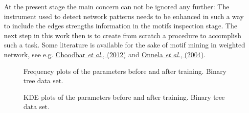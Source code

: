 \documentclass[a4paper,12pt]{article}
\begin{document}
At the present stage the main concern can not be ignored any further: The instrument used to detect network patterns needs to be enhanced in such a way to include the edges strengths information in the motifs inspection stage. The next step in this work then is to create from scratch a procedure to accomplish such a task. Some literature is available for the sake of motif mining in weighted network, see e.g. \href{https://ieeexplore.ieee.org/document/6406443}{Choodbar \textit{et al.}, (2012)} and \href{https://arxiv.org/pdf/cond-mat/0408629.pdf}{Onnela \textit{et al.}, (2004)}.



\begin{figure}[h!]
	\centering
	\par\medskip
	\par\medskip        
	\caption{Frequency plots of the parameters before and after training. Binary tree data set.}
	\label{fig:tree_hist}
\end{figure}

\begin{figure}[h!]
	\centering
	\par\medskip
	\par\medskip        
	\caption{KDE plots of the parameters before and after training. Binary tree data set.}
	\label{fig:tree_kde}
\end{figure}
\end{document}

